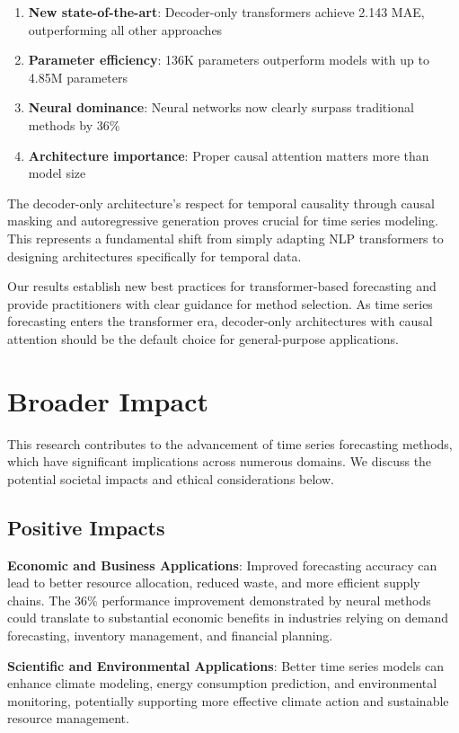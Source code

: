 \documentclass[11pt]{article}
\begin{document}
\begin{enumerate}
\item \textbf{New state-of-the-art}: Decoder-only transformers achieve 2.143 MAE, outperforming all other approaches
\item \textbf{Parameter efficiency}: 136K parameters outperform models with up to 4.85M parameters
\item \textbf{Neural dominance}: Neural networks now clearly surpass traditional methods by 36\%
\item \textbf{Architecture importance}: Proper causal attention matters more than model size
\end{enumerate}

The decoder-only architecture's respect for temporal causality through causal masking and autoregressive generation proves crucial for time series modeling. This represents a fundamental shift from simply adapting NLP transformers to designing architectures specifically for temporal data.

Our results establish new best practices for transformer-based forecasting and provide practitioners with clear guidance for method selection. As time series forecasting enters the transformer era, decoder-only architectures with causal attention should be the default choice for general-purpose applications.

\section*{Broader Impact}

This research contributes to the advancement of time series forecasting methods, which have significant implications across numerous domains. We discuss the potential societal impacts and ethical considerations below.

\subsection*{Positive Impacts}

\textbf{Economic and Business Applications}: Improved forecasting accuracy can lead to better resource allocation, reduced waste, and more efficient supply chains. The 36\% performance improvement demonstrated by neural methods could translate to substantial economic benefits in industries relying on demand forecasting, inventory management, and financial planning.

\textbf{Scientific and Environmental Applications}: Better time series models can enhance climate modeling, energy consumption prediction, and environmental monitoring, potentially supporting more effective climate action and sustainable resource management.
\end{document}

